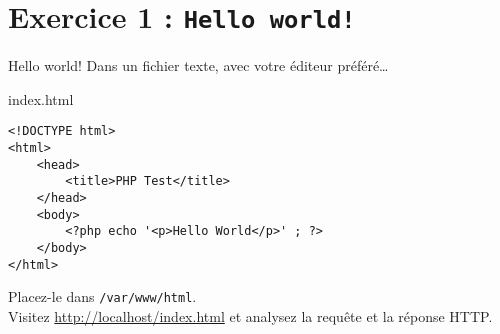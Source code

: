 

\section{Exercice \textnumero{}1 : \texttt{Hello world!}}

\begin{frame}[containsverbatim]{Hello world!}
Dans un fichier texte, avec votre éditeur préféré\ldots 
\begin{block}{index.html}
\begin{lstlisting}
<!DOCTYPE html>
<html>
    <head>
        <title>PHP Test</title>
    </head>
    <body>
        <?php echo '<p>Hello World</p>' ; ?>
    </body>
</html>
\end{lstlisting}
\end{block}
Placez-le dans \texttt{/var/www/html}.\\
Visitez \url{http://localhost/index.html} et analysez la requête et la réponse HTTP.
\end{frame}
